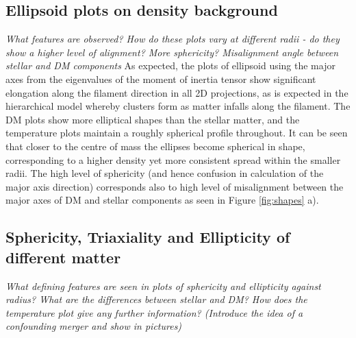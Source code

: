 \documentclass[journal]{IEEEtran}
\begin{document}
\subsection{Ellipsoid plots on density background}
\textit{What features are observed? How do these plots vary at different radii - do they show a higher level of alignment? More sphericity? 
Misalignment angle between stellar and DM components}
As expected, the plots of ellipsoid using the major axes from the eigenvalues of the moment of inertia tensor show significant elongation along the filament direction in all 2D projections, as is expected in the hierarchical model whereby clusters form as matter infalls along the filament. The DM plots show more elliptical shapes than the stellar matter, and the temperature plots maintain a roughly spherical profile throughout. It can be seen that closer to the centre of mass the ellipses become spherical in shape, corresponding to a higher density yet more consistent spread within the smaller radii. 
The high level of sphericity (and hence confusion in calculation of the major axis direction) corresponds also to high level of misalignment between the major axes of DM and stellar components as seen in Figure \ref{fig:shapes} a). 

\subsection{Sphericity, Triaxiality and Ellipticity of different matter}
\textit{What defining features are seen in plots of sphericity and ellipticity against radius? What are the differences between stellar and DM? How does the temperature plot give any further information?
(Introduce the idea of a confounding merger and show in pictures)}
\end{document}
